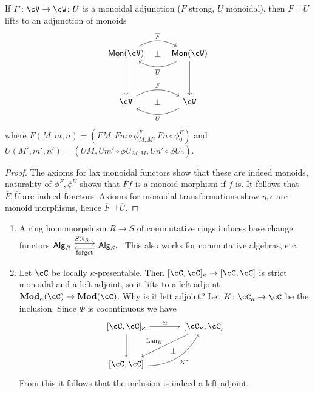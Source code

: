 \documentclass[a4paper,11pt,oneside,openany]{scrbook}
\begin{document}
\begin{prop}
	If $ F \from\cV\to \cW\colon U $ is a monoidal adjunction ($ F $ strong, $ U $ monoidal), then $ F\dashv U $ lifts to an adjunction of monoids
	\begin{displaymath}
		\begin{tikzcd}[row sep = 4em]
			\Mon(\cV)\arrow[d] \arrow[r,bend left, "\overline F"]\arrow[r,phantom, "\bot"] & \Mon(\cW) \arrow[l, bend left, "\overline U"] \arrow[d]\\
			\cV\arrow[r,bend left, "F"] \arrow[r,phantom, "\bot"]& \cW \arrow[l, bend left, "U"]
		\end{tikzcd}
	\end{displaymath}
	where $ \overline F(M,m,n) = (FM, Fm \circ \phi_{M,M}^F, Fn \circ \phi_0^F) $
	and $ \overline U(M',m',n') = (UM, Um'\circ \phi U_{M,M}, Un'\circ \phi U_0) $.
\end{prop}
\begin{proof}
	The axioms for lax monoidal functors show that these are indeed monoids,
	naturality of $ \phi^F, \phi^U $ shows that $ Ff $ is a monoid morphism if $
    f $ is. It follows that $ \overline F,\overline U $ are indeed functors.
	Axioms for monoidal transformations show $ \eta, \epsilon $ are monoid
    morphisms, hence $ \overline F \dashv \overline U $.
\end{proof}
\begin{exmp}
	\begin{enumerate}[label=\roman*)]
		\item A ring homomorpshism $ R \to S $ of commutative rings induces base change functors$\begin{tikzcd}
				      \mathsf{Alg}_R \arrow[r, shift left=.3em, "S\otimes_R -"]
                      & \mathsf{Alg}_S \arrow[l, shift left=.3em,
                      "\text{forget}"].
			\end{tikzcd}$
		      This also works for commutative algebras, etc.
		\item Let $\cC$ be locally $ \kappa $-presentable. Then $
            [\cC,\cC]_\kappa \to [\cC,\cC] $ is strict monoidal and a     left
            adjoint, so it lifts to a left adjoint $ \Mod_\kappa (\cC) \to
            \Mod(\cC) $.
		      Why is it left adjoint? Let $ K\from \cC_\kappa \to \cC$ be the inclusion. Since $ \Phi $ is cocontinuous we have
		      \begin{displaymath}
			      \begin{tikzcd}[row sep = large, column sep = large]
				      \lbrack\cC,\cC\rbrack_\kappa
				      \arrow[r, "\simeq"]\arrow[d] &
				      \lbrack\cC_\kappa,\cC\rbrack \arrow[dl, "\Lan_K"']\arrow[dl, phantom, "\bot", bend left=15]
				      \\
				      \lbrack\cC, \cC\rbrack \arrow[ru, "K^*"', bend right]
			      \end{tikzcd}
		      \end{displaymath}
		      From this it follows that the inclusion is indeed a left adjoint.
	\end{enumerate}
\end{exmp}
\end{document}

